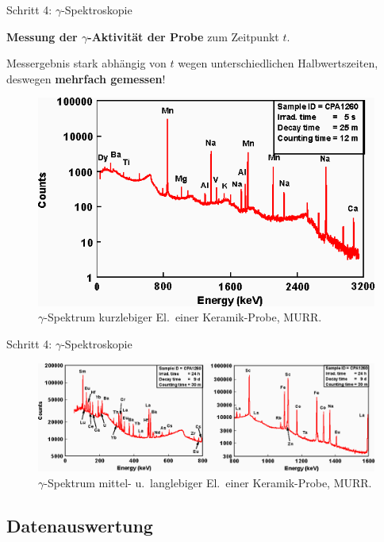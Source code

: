 \documentclass[xcolor=dvipsnames, aspectratio=169]{beamer}
\begin{document}
\begin{frame}{Schritt 4: $\gamma$-Spektroskopie}
\begin{minipage}{0.4\textwidth}\flushleft
\textbf{Messung der $\gamma$-Aktivität der Probe} zum Zeitpunkt $t$.\medskip

Messergebnis \alert{stark abhängig von $t$} wegen unterschiedlichen Halbwertszeiten, deswegen \textbf{mehrfach gemessen}!
\end{minipage}\hfill
\begin{minipage}{0.56\textwidth}
\begin{figure}
\includegraphics[width=\textwidth]{img/spect-1.png}
\caption{$\gamma$-Spektrum kurzlebiger El.\ einer Keramik-Probe, MURR.}
\end{figure}
\end{minipage}
\end{frame}

\begin{frame}{Schritt 4: $\gamma$-Spektroskopie}
\begin{figure}
\includegraphics[width=\textwidth]{img/spect-2.png}
\caption{$\gamma$-Spektrum mittel- u.\ langlebiger El.\ einer Keramik-Probe, MURR.}
\end{figure}
\end{frame}

\subsection{Datenauswertung}
\end{document}
